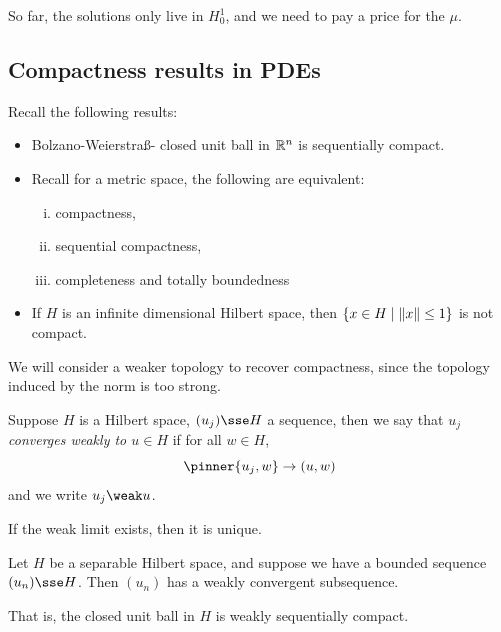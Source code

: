 \documentclass{article}
\begin{document}
So far, the solutions only live in \(H_0^1\), and we need to pay a price for the \(\mu\).

\subsection{Compactness results in PDEs}

Recall the following results:

\begin{itemize}
    \item Bolzano-Weierstra\ss - closed unit ball in \(\mathbb{R}^n\) is sequentially compact. 
    \item Recall for a metric space, the following are equivalent:
    \begin{enumerate}[(i)]
        \item compactness,
        \item sequential compactness,
        \item completeness and totally boundedness
    \end{enumerate}
    \item If \(H\) is an infinite dimensional Hilbert space, then \(\{x \in H \mid \norm{x} \le 1\}\) is not compact.
\end{itemize}

We will consider a weaker topology to recover compactness, since the topology induced by the norm is too strong.

\begin{definition}
    Suppose \(H\) is a Hilbert space, \((u_j) \sse H\) a sequence, then we say that
    \emph{\(u_j\) converges weakly to \(u \in H\)} if for all \(w \in H\),
    \[\pinner{u_j, w} \to (u, w)\]
    and we write \(u_j \weak u\).
\end{definition}

\begin{remark}
    If the weak limit exists, then it is unique.
\end{remark}

\begin{proposition}
     Let \(H\) be a separable Hilbert space, and suppose we have a bounded sequence \((u_n) \sse H\). Then \((u_n)\) has a weakly convergent subsequence.

    That is, the closed unit ball in \(H\) is weakly sequentially compact.
\end{proposition}
\end{document}
